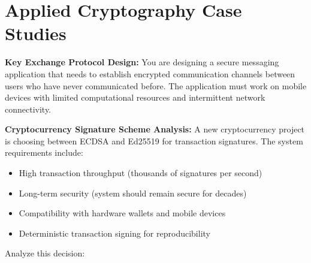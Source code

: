 \documentclass[10pt,a4paper,american]{exam}
\begin{document}
\section{Applied Cryptography Case Studies}
\begin{questions}
	\question[10] \textbf{Key Exchange Protocol Design:}
	You are designing a secure messaging application that needs to establish encrypted communication channels between users who have never communicated before. The application must work on mobile devices with limited computational resources and intermittent network connectivity.

	\question[10] \textbf{Cryptocurrency Signature Scheme Analysis:}
	A new cryptocurrency project is choosing between ECDSA and Ed25519 for transaction signatures. The system requirements include:
	\begin{itemize}
		\item High transaction throughput (thousands of signatures per second)
		\item Long-term security (system should remain secure for decades)
		\item Compatibility with hardware wallets and mobile devices
		\item Deterministic transaction signing for reproducibility
	\end{itemize}
	Analyze this decision:
	\begin{parts}

\end{parts}
\end{questions}
\end{document}
